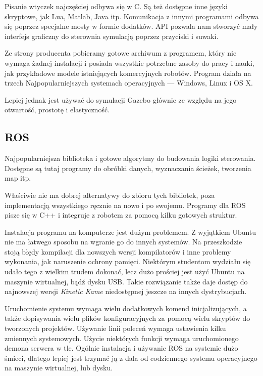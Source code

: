 Pisanie wtyczek najczęściej odbywa się w C. Są też dostępne inne języki skryptowe, jak Lua, Matlab, Java itp.
Komunikacja z innymi programami odbywa się poprzez specjalne mosty w formie dodatków.
API pozwala nam stworzyć mały interfejs graficzny do sterownia symulacją poprzez przyciski i suwaki.

Ze strony producenta pobieramy gotowe archiwum z programem, który nie wymaga żadnej instalacji i posiada wszystkie potrzebne zasoby do pracy i nauki, jak przykładowe modele istniejących komercyjnych robotów.
Program działa na trzech Najpopularniejszych systemach operacyjnych --- Windows, Linux i OS X.

Lepiej jednak jest używać do symulacji Gazebo głównie ze względu na jego otwartość, prostotę i elastyczność.

\subsection{ROS}
Najpopularniejsza biblioteka i gotowe algorytmy do budowania logiki sterowania.
Dostępne są tutaj programy do obróbki danych, wyznaczania ścieżek, tworzenia map itp.

Właściwie nie ma dobrej alternatywy do zbioru tych bibliotek, poza implementacją wszystkiego ręcznie na nowo i po swojemu.
Programy dla ROS pisze się w C++ i integruje z robotem za pomocą kilku gotowych struktur.

Instalacja programu na komputerze jest dużym problemem.
Z wyjątkiem Ubuntu nie ma łatwego sposobu na wgranie go do innych systemów.
Na przeszkodzie stoją błędy kompilacji dla nowszych wersji kompilatorów i inne problemy wykonania, jak naruszenie ochrony pamięci. 
Niektórym studentom wydziału się udało tego z wielkim trudem dokonać, lecz dużo prościej jest użyć Ubuntu na maszynie wirtualnej, bądź dysku USB.
Takie rozwiązanie także daje dostęp do najnowszej wersji \emph{Kinetic Kame} niedostępnej jeszcze na innych dystrybucjach.

Uruchomienie systemu wymaga wielu dodatkowych komend inicjalizujących, a także dopisywania wielu plików konfiguracyjnych za pomocą wielu skryptów do tworzonych projektów.
Używanie linii poleceń wymaga ustawienia kilku zmiennych systemowych.
Użycie niektórych funkcji wymaga uruchomionego demona serwera w tle.
Ogólnie instalacja i używanie ROS na systemie dużo śmieci, dlatego lepiej jest trzymać ją z dala od codziennego systemu operacyjnego na maszynie wirtualnej, lub dysku.

